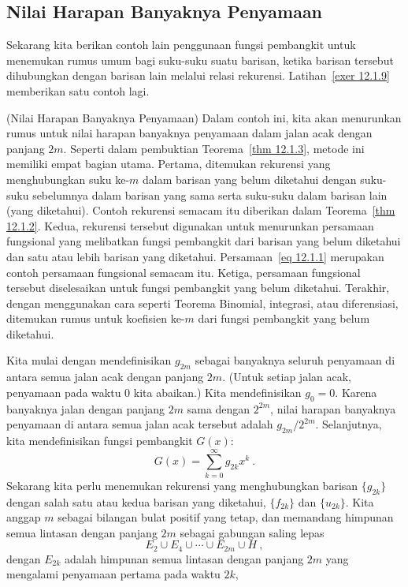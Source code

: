\subsection*{Nilai Harapan Banyaknya Penyamaan}
Sekarang kita berikan contoh lain penggunaan fungsi pembangkit untuk menemukan rumus umum bagi
suku-suku suatu barisan, ketika barisan tersebut dihubungkan dengan barisan lain melalui relasi rekurensi.
Latihan~\ref{exer 12.1.9} memberikan satu contoh lagi.
\begin{example}(Nilai Harapan Banyaknya Penyamaan)\label{exam
12.1.1} 
Dalam contoh ini, kita akan menurunkan rumus untuk nilai harapan banyaknya penyamaan dalam jalan
acak dengan panjang $2m$.  Seperti dalam pembuktian Teorema~\ref{thm 12.1.3}, metode ini memiliki empat bagian utama. 
Pertama, ditemukan rekurensi yang menghubungkan suku ke-$m$ dalam barisan yang belum diketahui dengan
suku-suku sebelumnya dalam barisan yang sama serta suku-suku dalam barisan lain (yang diketahui).  Contoh
rekurensi semacam itu diberikan dalam Teorema~\ref{thm 12.1.2}.  Kedua, rekurensi tersebut digunakan untuk menurunkan
persamaan fungsional yang melibatkan fungsi pembangkit dari barisan yang belum diketahui dan satu atau lebih
barisan yang diketahui.  Persamaan~\ref{eq 12.1.1} merupakan contoh persamaan fungsional semacam itu.  Ketiga,
persamaan fungsional tersebut diselesaikan untuk fungsi pembangkit yang belum diketahui.  Terakhir, dengan menggunakan
cara seperti
Teorema Binomial, integrasi, atau diferensiasi, ditemukan rumus untuk koefisien ke-$m$
dari fungsi pembangkit yang belum diketahui.
\par
Kita mulai dengan mendefinisikan $g_{2m}$ sebagai banyaknya seluruh penyamaan di antara semua jalan acak
dengan panjang $2m$.  (Untuk setiap jalan acak, penyamaan pada waktu 0 kita abaikan.)  Kita
mendefinisikan $g_0 = 0$.  Karena banyaknya jalan dengan panjang $2m$ sama dengan $2^{2m}$, nilai harapan
banyaknya penyamaan di antara semua jalan acak tersebut adalah $g_{2m}/2^{2m}$.  Selanjutnya, kita mendefinisikan
fungsi pembangkit
$G(x)$:
$$G(x) = \sum_{k = 0}^\infty g_{2k}x^k\ .$$
Sekarang kita perlu menemukan rekurensi yang menghubungkan barisan $\{g_{2k}\}$ dengan salah satu atau kedua
barisan yang diketahui, $\{f_{2k}\}$ dan $\{u_{2k}\}$.  Kita anggap $m$ sebagai bilangan bulat positif yang tetap,
dan memandang himpunan semua lintasan dengan panjang $2m$ sebagai gabungan saling lepas
$$ E_2 \cup E_4 \cup \cdots \cup E_{2m} \cup H\ ,$$
dengan $E_{2k}$ adalah himpunan semua lintasan dengan panjang $2m$ yang mengalami penyamaan pertama pada waktu $2k$,

\end{example}
